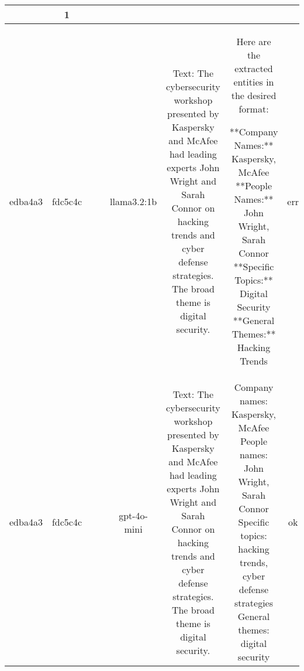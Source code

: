 \begin{table}[h!]
\begin{tabular}{|c|c|c|c|c|c|c|c|c|c|}
{Additionally, there is a statement "Let me know if you'd like me to analyze another text! 😊" which is not part of the desired format. As per the description, the output should strictly adhere to the desired format specified, and this extraneous statement violates that.

Based on these observations, the output does not fully comply with the chatbot description due to the presence of content outside the desired format specifications.

ERR & 1\\
\hline
edba4a3 & fdc5c4c &  &  & llama3.2:1b & Text: The cybersecurity workshop presented by Kaspersky and McAfee had leading experts John Wright and Sarah Connor on hacking trends and cyber defense strategies. The broad theme is digital security. & Here are the extracted entities in the desired format:

**Company Names:** Kaspersky, McAfee
**People Names:** John Wright, Sarah Connor
**Specific Topics:** Digital Security
**General Themes:** Hacking Trends & err & The output of the chatbot does not comply fully with the specified desired format. According to the description, the desired format requires items under each category to be presented in a comma-separated list, specifically in the format: Company names: <comma_separated_list_of_company_names>, and so forth for other categories. However, the output lists each category with comma-separated items but uses a colon at the end of the label title followed by the list itself not enclosed with angled brackets as specified in the description. Additionally, while the general information seems to be in the correct logical order, the format as specified has not been adhered to.

ERR & 1\\
\hline
edba4a3 & fdc5c4c &  &  & gpt-4o-mini & Text: The cybersecurity workshop presented by Kaspersky and McAfee had leading experts John Wright and Sarah Connor on hacking trends and cyber defense strategies. The broad theme is digital security. & Company names: Kaspersky, McAfee  
People names: John Wright, Sarah Connor  
Specific topics: hacking trends, cyber defense strategies  
General themes: digital security & ok & The chatbot output fully complies with the description. The format used aligns perfectly with the specified structure in the description:

1. **Company names**: The output lists "Kaspersky, McAfee" which adheres to the '<comma_separated_list_of_company_names>' format.
2. **People names**: "John Wright, Sarah Connor" are provided in a similar comma-separated list format.
3. **Specific topics**: The output correctly provides a list of specific topics: "hacking trends, cyber defense strategies".
4. **General themes**: A general theme is succinctly provided: "digital security".

}
\end{tabular}
\end{table}

